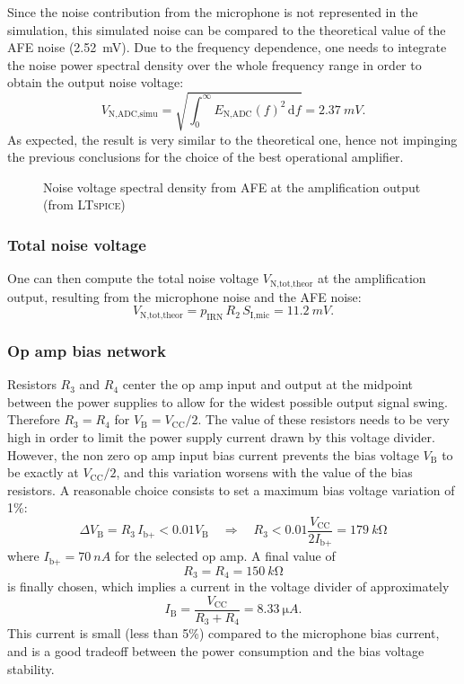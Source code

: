 \documentclass{EPL-master-thesis-covers-EN}
\newcommand{\te}[1]{\textrm{#1}}
\begin{document}
Since the noise contribution from the microphone is not represented in the simulation, this simulated noise can be compared to the theoretical value of the AFE noise (\SI{2.52}{mV}). Due to the frequency dependence, one needs to integrate the noise power spectral density over the whole frequency range in order to obtain the output noise voltage:
\[
 V_\te{N,ADC,simu} = \sqrt{\int_{0}^{\infty} E_\te{N,ADC}(f)^2 \, \te{d}f} = \SI{2.37}{mV}.
\]
As expected, the result is very similar to the theoretical one, hence not impinging the previous conclusions for the choice of the best operational amplifier.


\begin{figure}[H]
    \centering
    
    \caption{Noise voltage spectral density from AFE at the amplification output (from \textsc{LTspice})}
    \label{fig:output_noise_op_amp_freq}
\end{figure}

\subsubsection*{Total noise voltage}

One can then compute the total noise voltage $V_\te{N,tot,theor}$ at the amplification output, resulting from the microphone noise and the AFE noise:
\[
 V_\te{N,tot,theor} = p_\te{IRN} \, R_2\,S_{\te{I,mic}} = \SI{11.2}{mV}.
\]


\subsubsection*{Op amp bias network}

Resistors $R_3$ and $R_4$ center the op amp input and output at the midpoint between the power supplies to allow for the widest possible output signal swing. Therefore $R_3 = R_4$ for $V_\te{B} = V_\te{CC} / 2$. The value of these resistors needs to be very high in order to limit the power supply current drawn by this voltage divider. However, the non zero op amp input bias current prevents the bias voltage $V_\te{B}$ to be exactly at $V_\te{CC} / 2$, and this variation worsens with the value of the bias resistors. A reasonable choice consists to set a maximum bias voltage variation of 1\%:
\[
 \Delta V_\te{B} = R_3 \, I_\te{b+} < 0.01 V_\te{B} \quad \Rightarrow \quad R_3 < 0.01 \frac{V_\te{CC}}{2I_\te{b+}} = \SI{179}{k\ohm}
\]
where $I_\te{b+} = \SI{70}{nA}$ for the selected op amp. A final value of
\[
 R_3 = R_4 = \SI{150}{k\ohm}
\]
is finally chosen, which implies a current in the voltage divider of approximately
\[
 I_\te{B} = \frac{V_\te{CC}}{R_3 + R_4} = \SI{8.33}{\micro A}.
\]
This current is small (less than 5\%) compared to the microphone bias current, and is a good tradeoff between the power consumption and the bias voltage stability.
\end{document}
